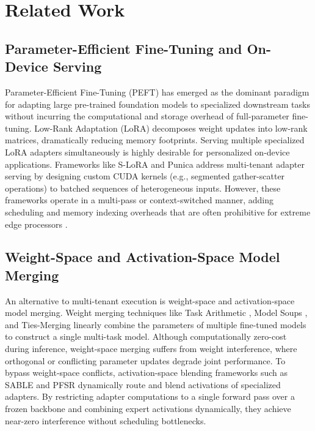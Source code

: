 \section{Related Work}
\label{submission:sec:related_work}

\subsection{Parameter-Efficient Fine-Tuning and On-Device Serving}
Parameter-Efficient Fine-Tuning (PEFT) has emerged as the dominant paradigm for adapting large pre-trained foundation models to specialized downstream tasks without incurring the computational and storage overhead of full-parameter fine-tuning. Low-Rank Adaptation (LoRA) \cite{hu2021lora} decomposes weight updates into low-rank matrices, dramatically reducing memory footprints. Serving multiple specialized LoRA adapters simultaneously is highly desirable for personalized on-device applications. Frameworks like S-LoRA \cite{sheng2023slora} and Punica \cite{chen2023punica} address multi-tenant adapter serving by designing custom CUDA kernels (e.g., segmented gather-scatter operations) to batched sequences of heterogeneous inputs. However, these frameworks operate in a multi-pass or context-switched manner, adding scheduling and memory indexing overheads that are often prohibitive for extreme edge processors \cite{lane2015deep, zhou2019edge}.

\subsection{Weight-Space and Activation-Space Model Merging}
An alternative to multi-tenant execution is weight-space and activation-space model merging. Weight merging techniques like Task Arithmetic \cite{ilharco2022editing}, Model Soups \cite{wortsman2022model}, and Ties-Merging \cite{yadav2023ties} linearly combine the parameters of multiple fine-tuned models to construct a single multi-task model. Although computationally zero-cost during inference, weight-space merging suffers from weight interference, where orthogonal or conflicting parameter updates degrade joint performance. To bypass weight-space conflicts, activation-space blending frameworks such as SABLE \cite{mbh2025} and PFSR \cite{pfsr2025} dynamically route and blend activations of specialized adapters. By restricting adapter computations to a single forward pass over a frozen backbone and combining expert activations dynamically, they achieve near-zero interference without scheduling bottlenecks.


